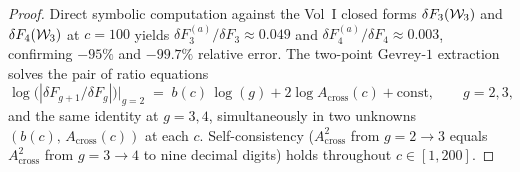 \begin{proof}
Direct symbolic computation against the Vol~I closed forms
$\delta F_3(\mathcal{W}_3)$ and $\delta F_4(\mathcal{W}_3)$ at $c = 100$ yields
$\delta F_3^{(a)}/\delta F_3 \approx 0.049$ and
$\delta F_4^{(a)}/\delta F_4 \approx 0.003$, confirming
$-95\%$ and $-99.7\%$ relative error. The two-point Gevrey-$1$
extraction solves the pair of ratio equations
\[
 \log\bigl(|\delta F_{g + 1}/\delta F_g|\bigr) \big|_{g = 2}
 \;=\;
 b(c)\, \log(g) + 2 \log A_{\mathrm{cross}}(c) + \mathrm{const},
\qquad g = 2, 3,
\]
and the same identity at $g = 3, 4$, simultaneously in two unknowns
$(b(c),\, A_{\mathrm{cross}}(c))$ at each $c$. Self-consistency
($A_{\mathrm{cross}}^2$ from $g = 2 \to 3$ equals $A_{\mathrm{cross}}^2$
from $g = 3 \to 4$ to nine decimal digits) holds throughout
$c \in [1, 200]$.
\end{proof}

